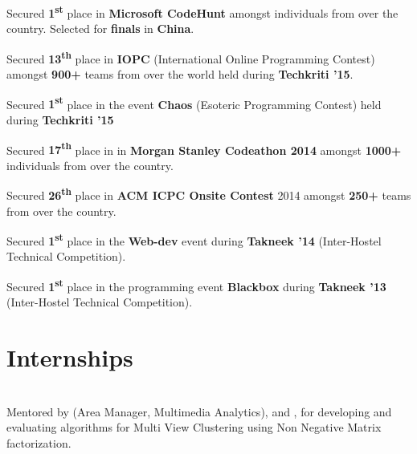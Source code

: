 \documentclass[a4paper]{norm-resume}
\begin{document}
\begin{tightitemize}
	\item Secured \textbf{1\textsuperscript{st}} place in \textbf{Microsoft CodeHunt} amongst individuals from over the country. Selected for \textbf{finals} in \textbf{China}.
	\item Secured \textbf{13\textsuperscript{th}} place in \textbf{IOPC} (International Online Programming Contest) amongst \textbf{900+} teams from over the world held during \textbf{Techkriti '15}.
	\item Secured \textbf{1\textsuperscript{st}} place in the event \textbf{Chaos} (Esoteric Programming Contest) held during \textbf{Techkriti '15}
	\item Secured \textbf{17\textsuperscript{th}} place in in \textbf{Morgan Stanley Codeathon 2014} amongst \textbf{1000+} individuals from over the country.
	\item Secured \textbf{26\textsuperscript{th}} place in \textbf{ACM ICPC Onsite Contest} 2014 amongst \textbf{250+} teams from over the country.
	\item Secured \textbf{1\textsuperscript{st}} place in the \textbf{Web-dev} event during \textbf{Takneek '14} (Inter-Hostel Technical Competition).
	\item Secured \textbf{1\textsuperscript{st}} place in the programming event \textbf{Blackbox} during \textbf{Takneek '13} (Inter-Hostel Technical Competition).
\end{tightitemize}

\vspace{1mm}	%


\section{Internships}

\vspace{2mm} %
		
				

\vspace{-2mm} %

	\begin{changemargin}{1.0cm}{0.0cm} 
	{
	\large{}  \\
	\small{Mentored by  (Area Manager, Multimedia Analytics),  and , for developing and evaluating algorithms for Multi View Clustering using Non Negative Matrix factorization.} 		
	}
	\end{changemargin} 	
	
\end{document}
